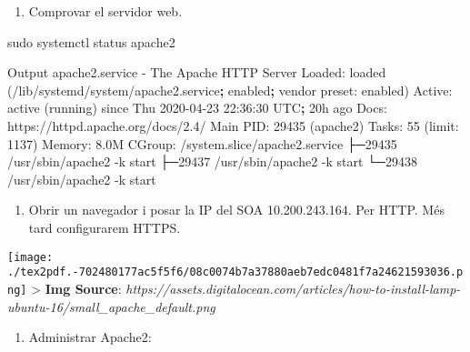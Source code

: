 \documentclass[]{article}
\newenvironment{Shaded}{}{}
\newcommand{\ExtensionTok}[1]{#1}
\newcommand{\FunctionTok}[1]{\textcolor[rgb]{0.02,0.16,0.49}{#1}}
\newcommand{\KeywordTok}[1]{\textcolor[rgb]{0.00,0.44,0.13}{\textbf{#1}}}
\newcommand{\NormalTok}[1]{#1}
\providecommand{\tightlist}{%
  \setlength{\itemsep}{0pt}\setlength{\parskip}{0pt}}
\begin{document}
\begin{enumerate}
\def\labelenumi{\arabic{enumi}.}
\setcounter{enumi}{2}
\tightlist
\item
  Comprovar el servidor web.
\end{enumerate}

\begin{Shaded}
\begin{Highlighting}[]
\FunctionTok{sudo}\NormalTok{ systemctl status apache2}
\end{Highlighting}
\end{Shaded}

\begin{Shaded}
\begin{Highlighting}[]
\ExtensionTok{Output}
\ExtensionTok{apache2.service}\NormalTok{ - The Apache HTTP Server}
     \ExtensionTok{Loaded}\NormalTok{: loaded (/lib/systemd/system/apache2.service}\KeywordTok{;} \ExtensionTok{enabled}\KeywordTok{;} \ExtensionTok{vendor}\NormalTok{ preset: enabled)}
     \ExtensionTok{Active}\NormalTok{: active (running) }\ExtensionTok{since}\NormalTok{ Thu 2020-04-23 22:36:30 UTC}\KeywordTok{;} \ExtensionTok{20h}\NormalTok{ ago}
       \ExtensionTok{Docs}\NormalTok{: https://httpd.apache.org/docs/2.4/}
   \ExtensionTok{Main}\NormalTok{ PID: 29435 (apache2)}
      \ExtensionTok{Tasks}\NormalTok{: 55 (limit: 1137)}
     \ExtensionTok{Memory}\NormalTok{: 8.0M}
     \ExtensionTok{CGroup}\NormalTok{: /system.slice/apache2.service}
\NormalTok{             ├─}\ExtensionTok{29435}\NormalTok{ /usr/sbin/apache2 -k start}
\NormalTok{             ├─}\ExtensionTok{29437}\NormalTok{ /usr/sbin/apache2 -k start}
\NormalTok{             └─}\ExtensionTok{29438}\NormalTok{ /usr/sbin/apache2 -k start}
\end{Highlighting}
\end{Shaded}

\begin{enumerate}
\def\labelenumi{\arabic{enumi}.}
\setcounter{enumi}{3}
\tightlist
\item
  Obrir un navegador i posar la IP del SOA 10.200.243.164. Per HTTP. Més
  tard configurarem HTTPS.
\end{enumerate}

\texttt{[image: ./tex2pdf.-702480177ac5f5f6/08c0074b7a37880aeb7edc0481f7a24621593036.png]}
\textgreater{} \textbf{Img Source}:
\emph{https://assets.digitalocean.com/articles/how-to-install-lamp-ubuntu-16/small\_apache\_default.png}

\begin{enumerate}
\def\labelenumi{\arabic{enumi}.}
\setcounter{enumi}{4}
\tightlist
\item
  Administrar Apache2:
\end{enumerate}
\end{document}

